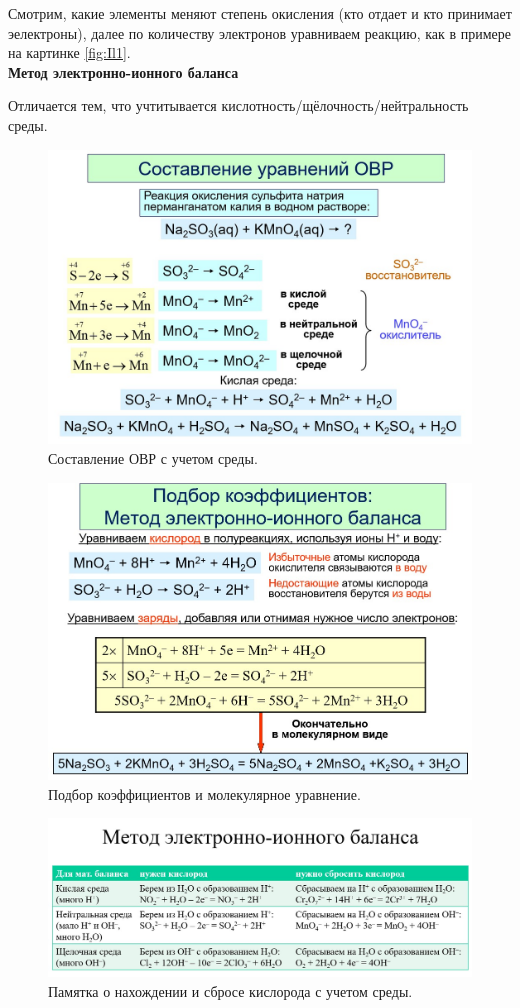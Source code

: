 Смотрим, какие элементы меняют степень окисления (кто отдает и кто принимает эелектроны), далее по количеству электронов уравниваем реакцию, как в примере на картинке \ref{fig:Il1}.\\

\textbf{Метод электронно-ионного баланса}

Отличается тем, что учтитывается кислотность/щёлочность/нейтральность среды.

\begin{figure}[H]
	\centering
	\includegraphics[width=\linewidth]{Pictures/El1.jpg}
	\caption{Составление ОВР с учетом среды.}
\end{figure}
\begin{figure}[H]
	\centering
	\includegraphics[width=\linewidth]{Pictures/El2.jpg}
	\caption{Подбор коэффициентов и молекулярное уравнение.}
\end{figure}
\begin{figure}[H]
	\centering
	\includegraphics[width=\linewidth]{Pictures/El3.jpg}
	\caption{Памятка о нахождении и сбросе кислорода с учетом среды.}
\end{figure}


